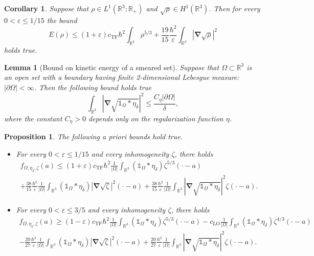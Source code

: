 \documentclass[10pt,a4paper]{amsart}
\newtheorem{corollary}{Corollary}
\newtheorem{lemma}{Lemma}
\newtheorem{proposition}{Proposition}
\newcommand{\LO}{\mathrm{LO}} %
\newcommand{\RR}{\mathbb{R}}
\newcommand{\TF}{\mathrm{TF}} %
\renewcommand{\epsilon}{\varepsilon}
\renewcommand{\ge}{\geqslant}
\newcommand{\grad}{\bm{\nabla}} %
\newcommand{\iden}{\mathbb{1}} %
\renewcommand{\le}{\leqslant}
\begin{document}
\begin{corollary}\label{llsebound}
Suppose that $\rho\in L^1(\RR^3;\RR_+)$ and $\sqrt{\rho}\in H^1(\RR^3)$. Then for every $0<\epsilon\le 1/15$ the bound
$$
E(\rho)\le (1+\epsilon)c_\TF\hbar^2 \int_{\RR^3} \rho^{5/3} + \frac{19}{15}\frac{\hbar^2}{\epsilon} \int_{\RR^3} |\grad\sqrt{\rho}|^2
$$
holds true. 
\end{corollary}

\begin{lemma}[Bound on kinetic energy of a smeared set]\label{indgradlemma}
Suppose that $\Omega\subset\RR^3$ is an open set with a boundary having finite 2-dimensional Lebesgue measure: $|\partial\Omega|<\infty$. 
Then the following bound holds true
$$
\int_{\RR^3} \left|\grad \sqrt{\iden_\Omega*\eta_\delta}\right|^2\le \frac{C_\eta|\partial\Omega|}{\delta},
$$
where the constant $C_\eta>0$ depends only on the regularization function $\eta$.
\end{lemma}

\begin{proposition}\label{basicbdprop}
The following a priori bounds hold true.
\begin{itemize}
\item[(i)] For every $0<\epsilon\le 1/15$ and every inhomogeneity $\zeta$, there holds
\begin{multline*}
f_{\Omega,\eta_\delta,\zeta}(a)\le (1+\epsilon) c_{\TF}\hbar^2  \frac{1}{|\Omega|} \int_{\RR^3} (\iden_{\Omega}*\eta_\delta)\zeta^{5/3}(\cdot-a) \\
+ \frac{38}{15}\frac{\hbar^2}{\epsilon} \frac{1}{|\Omega|} \int_{\RR^3} (\iden_{\Omega}*\eta_\delta)|\grad \sqrt{\zeta}|^2(\cdot-a)+ \frac{38}{15}\frac{\hbar^2}{\epsilon} \frac{1}{|\Omega|} \int_{\RR^3} |\grad \sqrt{\iden_{\Omega}*\eta_\delta}|^2\zeta(\cdot-a) .
\end{multline*}
\item[(ii)] For every $0<\epsilon\le 3/5$ and every inhomogeneity $\zeta$, there holds 
\begin{multline*}
f_{\Omega,\eta_\delta,\zeta}(a)\ge (1-\epsilon) c_{\TF}\hbar^2  \frac{1}{|\Omega|} \int_{\RR^3} (\iden_{\Omega}*\eta_\delta)\zeta^{5/3}(\cdot-a) -c_\LO \frac{1}{|\Omega|}\int_{\RR^3} (\iden_{\Omega}*\eta_\delta)\zeta^{4/3}(\cdot-a) \\
- \frac{20}{27}\frac{\hbar^2}{\epsilon} \frac{1}{|\Omega|} \int_{\RR^3} (\iden_{\Omega}*\eta_\delta)|\grad \sqrt{\zeta}|^2(\cdot-a) + \frac{20}{27}\frac{\hbar^2}{\epsilon} \frac{1}{|\Omega|} \int_{\RR^3} |\grad \sqrt{\iden_{\Omega}*\eta_\delta}|^2\zeta(\cdot-a) .
\end{multline*}
\end{itemize}
\end{proposition}
\end{document}
